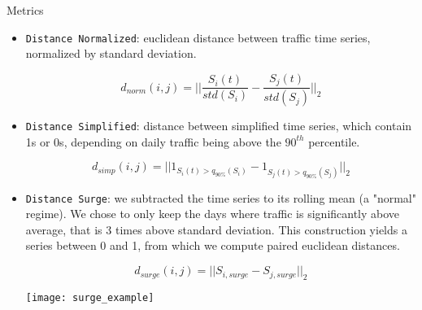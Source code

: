 \documentclass[final]{beamer}
\newlength{\onecolwid}
\newlength{\twocolwid}
\begin{document}
\begin{frame}[t]
\begin{columns}[t]
\begin{column}{\twocolwid} %

\begin{columns}[t,totalwidth=\twocolwid] %

\begin{column}{\onecolwid}\vspace{-.6in} %


\begin{block}{Metrics}

  \begin{itemize}
  \item \texttt{Distance Normalized}: euclidean distance between traffic time series, normalized by standard deviation.

  $$d_{norm}(i, j) = ||\frac{S_i(t)}{std(S_i)} - \frac{S_j(t)}{std(S_j)}||_2$$

  \item \texttt{Distance Simplified}: distance between simplified time series, which contain 1s or 0s, depending on daily traffic being above the $90^{th}$ percentile.

  $$d_{simp}(i, j) = ||1_{S_i(t) > q_{90\%}(S_i)} - 1_{S_j(t) > q_{90\%}(S_j)}||_2$$

  \item \texttt{Distance Surge}: we subtracted the time series to its rolling mean (a "normal" regime). We chose to only keep the days where traffic is significantly above average, that is 3 times above standard deviation. This construction yields a series between 0 and 1, from which we compute paired euclidean distances.


  $$d_{surge}(i, j) = ||S_{i, surge} - S_{j, surge}||_2$$

  \begin{center}
    \texttt{[image: surge\_example]}
  \end{center}
\end{itemize}

\end{block}



\end{column}
\end{columns}
\end{column}
\end{columns}
\end{frame}
\end{document}
